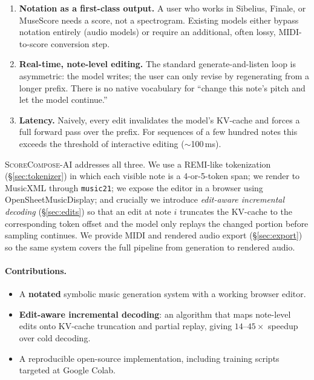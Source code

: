 \documentclass[11pt,a4paper]{article}
\begin{document}
\begin{enumerate}
  \item \textbf{Notation as a first-class output.} A user who works in
        Sibelius, Finale, or MuseScore needs a score, not a spectrogram.
        Existing models either bypass notation entirely (audio models) or
        require an additional, often lossy, MIDI-to-score conversion step.
  \item \textbf{Real-time, note-level editing.} The standard generate-and-listen
        loop is asymmetric: the model writes; the user can only revise by
        regenerating from a longer prefix. There is no native vocabulary
        for ``change this note's pitch and let the model continue.''
  \item \textbf{Latency.} Naively, every edit invalidates the model's
        KV-cache and forces a full forward pass over the prefix. For
        sequences of a few hundred notes this exceeds the threshold of
        interactive editing ($\sim$100\,ms).
\end{enumerate}

\textsc{ScoreCompose-AI} addresses all three. We use a REMI-like
tokenization (\S\ref{sec:tokenizer}) in which each visible note is a
4-or-5-token span; we render to MusicXML through \texttt{music21}; we
expose the editor in a browser using OpenSheetMusicDisplay; and crucially
we introduce \emph{edit-aware incremental decoding} (\S\ref{sec:edits}) so
that an edit at note $i$ truncates the KV-cache to the corresponding token
offset and the model only replays the changed portion before sampling
continues. We provide MIDI and rendered audio export
(\S\ref{sec:export}) so the same system covers the full pipeline from
generation to rendered audio.

\paragraph{Contributions.}
\begin{itemize}
\item A \textbf{notated} symbolic music generation system with a working
      browser editor.
\item \textbf{Edit-aware incremental decoding}: an algorithm that maps
      note-level edits onto KV-cache truncation and partial replay, giving
      $14$--$45\times$ speedup over cold decoding.
\item A reproducible open-source implementation, including training
      scripts targeted at Google Colab.
\end{itemize}
\end{document}
